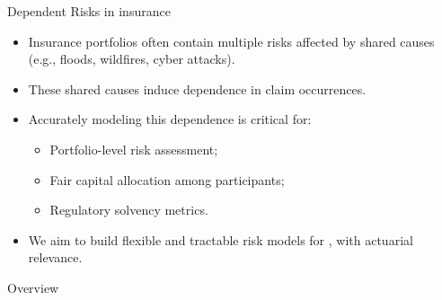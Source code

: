 \documentclass[11pt,xcolor={dvipsnames},hyperref={pdftex,pdfpagemode=UseNone,hidelinks,pdfdisplaydoctitle=true},usepdftitle=false]{beamer}
\begin{document}
\begin{frame}{Dependent Risks in insurance}
\begin{itemize}
    \item Insurance portfolios often contain multiple risks affected by shared causes (e.g., floods, wildfires, cyber attacks).
    
    \item These shared causes induce dependence in claim occurrences.
    
    \item Accurately modeling this dependence is critical for:
    \begin{itemize}
        \item Portfolio-level risk assessment;
        \item Fair capital allocation among participants;
        \item Regulatory solvency metrics.
    \end{itemize}
    
    \item We aim to build flexible and tractable risk models for , with actuarial relevance.
\end{itemize}
\end{frame}

\begin{frame}[label=toc]{Overview}
    \setlength{\leftskip}{5cm}%
    \tableofcontents[subsectionstyle=hide]
\end{frame}
\end{document}
